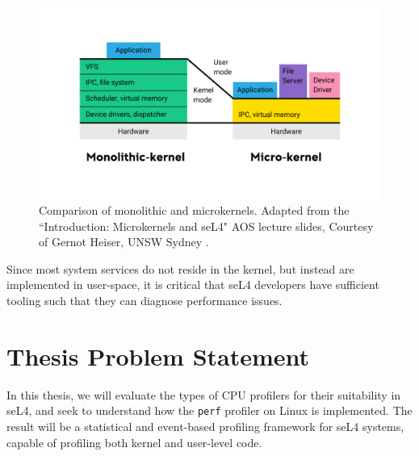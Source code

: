 \begin{figure}[htp!]
    \includegraphics[width=\linewidth]{report-a_micro_v_mono}
    \caption{Comparison of monolithic and microkernels. Adapted from the ``Introduction: Microkernels and seL4" AOS lecture slides, Courtesy of Gernot Heiser, UNSW Sydney \cite{AOSMicrokernelSlide}.}
    \label{fig:sel4_kernel_comparison}
\end{figure}

Since most system services do not reside in the kernel, but instead are implemented in user-space, it is critical that seL4 developers have sufficient tooling such that they can diagnose performance issues.

\section{Thesis Problem Statement}

In this thesis, we will evaluate the types of CPU profilers for their suitability in seL4, and seek to understand how the \texttt{perf} profiler on Linux is implemented. The result will be a statistical and event-based profiling framework for seL4 systems, capable of profiling both kernel and user-level code.